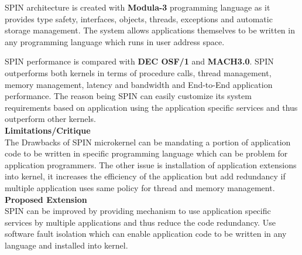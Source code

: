 \documentclass[a4paper, 10pt]{article}
\begin{document}
SPIN architecture is created with \textbf{Modula-3} programming language as it provides type safety, interfaces, objects, threads, exceptions and automatic storage management. The system allows applications themselves to be written in any programming language which runs in user address space.

SPIN performance is compared with \textbf{DEC OSF/1} and \textbf{MACH3.0}. SPIN outperforms both kernels in terms of procedure calls, thread management, memory management, latency and bandwidth and End-to-End application performance. The reason being SPIN can easily customize its system requirements based on application using the application specific services and thus outperform other kernels.\\

\noindent
\large\textbf{Limitations/Critique}\\
The Drawbacks of SPIN microkernel can be mandating a portion of application code to be written in specific programming language which can be problem for application programmers. The other issue is installation of application extensions into kernel, it increases the efficiency of the application but add redundancy if multiple application uses same policy for thread and memory management.\\ 

\noindent
\large\textbf{Proposed Extension}\\
SPIN can be improved by providing mechanism to use application specific services by multiple applications and thus reduce the code redundancy. Use software fault isolation which can enable application code to be written in any language and installed into kernel.
\end{document}

